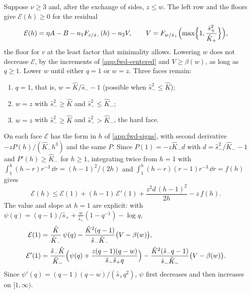 Suppose $\nu\ge3$ and, after the exchange of sides, $z\le w$. The left row and the floors give
$\mathcal E(h)\ge0$ for the residual
\[
\mathcal E(h)=\eta A-B-n_1F_{z/\hat s_-}(h)-n_2V,\qquad
V=F_{w/\hat s_+}\Bigl(\max\Bigl\{1,\frac{\hat s_+^2}{\hat K_+}\Bigr\}\Bigr),
\]
the floor for $v$ at the least factor that minimality allows. Lowering $w$ does not decrease
$\mathcal E$, by the increments of \cref{app:fwd-centered} and $V\ge\beta(w)$, as long as $q\ge1$.
Lower $w$ until either $q=1$ or $w=z$. Three faces remain:
\begin{enumerate}
\item $q=1$, that is, $w=\hat K/\hat s_--1$ (possible when $\hat s_-^2\le\hat K$);
\item $w=z$ with $\hat s_-^2\ge\hat K$ and $\hat s_-^2\le\hat K_-$;
\item $w=z$ with $\hat s_-^2\ge\hat K$ and $\hat s_-^2>\hat K_-$, the hard face.
\end{enumerate}
On each face $\mathcal E$ has the form in $h$ of \cref{app:fwd-signs}, with second derivative
$-zP(h)/(\hat K_-h^3)$ and the same $P$. Since $P(1)=-z\hat K_-d$ with
$d=\hat s_-^2/\hat K_--1$ and $P'(h)\ge\hat K_-$ for $h\ge1$, integrating twice from $h=1$ with
$\int_1^h(h-r)r^{-3}\,\dd r=(h-1)^2/(2h)$ and $\int_1^h(h-r)(r-1)r^{-3}\,\dd r=f(h)$ gives
\begin{equation}\label{eq:fwd-integral}
\mathcal E(h)\le\mathcal E(1)+(h-1)\,\mathcal E'(1)+\frac{z^2d\,(h-1)^2}{2h}-z\,f(h).
\end{equation}
The value and slope at $h=1$ are explicit: with
$\psi(q)=(q-1)/\hat s_++\frac w{\hat s_+}(1-q^{-1})-\log q$,
\begin{align*}
\mathcal E(1)&=\frac{\hat K}{\hat K_-}\,\psi(q)-\frac{\hat K^2(q-1)}{\hat s_-\hat K_-}\bigl(V-\beta(w)\bigr),\\
\mathcal E'(1)&=\frac{\hat s_-\hat K}{\hat K_-}\Bigl(\psi(q)+\frac{z(q-1)(q-w)}{\hat s_-\hat s_+q}\Bigr)
 -\frac{\hat K^2(\hat s_-q-1)}{\hat s_-\hat K_-}\bigl(V-\beta(w)\bigr).
\end{align*}
Since $\psi'(q)=(q-1)(q-w)/(\hat s_+q^2)$, $\psi$ first decreases and then increases on $[1,\infty)$.
